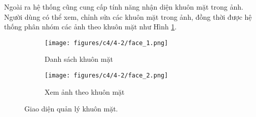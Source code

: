 Ngoài ra hệ thống cũng cung cấp tính năng nhận diện khuôn mặt trong ảnh. Người dùng có thể xem, chỉnh sửa các khuôn mặt trong ảnh, đồng thời được hệ thống phân nhóm các ảnh theo khuôn mặt như Hình \ref{fig:explore_face}.

\begin{figure}[H]
    \centering
    \begin{subfigure}{0.48\textwidth}
        \texttt{[image: figures/c4/4-2/face\_1.png]} 
        \caption{Danh sách khuôn mặt}
    \end{subfigure}
    \hfill
    \begin{subfigure}{0.48\textwidth}
        \texttt{[image: figures/c4/4-2/face\_2.png]} 
        \caption{Xem ảnh theo khuôn mặt}
    \end{subfigure}
    \caption{Giao diện quản lý khuôn mặt.}
    \label{fig:explore_face}
\end{figure}